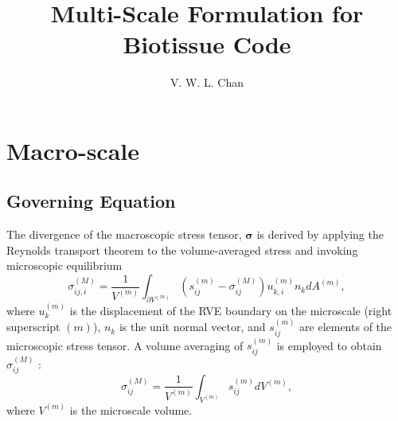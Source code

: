 \documentclass[12pt,aps,pre]{revtex4}
\begin{document}
\title{Multi-Scale Formulation for Biotissue Code}
\author{V. W. L. Chan}
\maketitle

\section{Macro-scale}

\subsection{Governing Equation}

The divergence of the macroscopic stress tensor, $\pmb{\sigma}$ is derived by applying the Reynolds transport theorem to the volume-averaged stress and invoking microscopic equilibrium \cite{Chandran:2007hy,Stylianopoulos:2007dp} 
%
\begin{equation}
\sigma_{ij,i}^{(M)} = \frac{1}{V^{(m)}} \int_{\partial V^{(m)}} \left( s_{ij}^{(m)} - \sigma_{ij}^{(M)} \right)u_{k,i}^{(m)} n_k dA^{(m)},
\label{eq:macro_stress_divergence}
\end{equation}
%
where $u_k^{(m)}$ is the displacement of the RVE boundary on the microscale (right superscript $(m)$), $n_k$ is the unit normal vector, and $s_{ij}^{(m)}$ are elements of the microscopic stress tensor. A volume averaging of $s_{ij}^{(m)}$ is employed to obtain $\sigma_{ij}^{(M)}$ \cite{Chandran:2007hy}:
%
\begin{equation}
\sigma_{ij}^{(M)} = \frac{1}{V^{(m)}}\int_{V^{(m)}}s_{ij}^{(m)} dV^{(m)},
\label{eq:macro_stress_volume_avg}
\end{equation}
%
where $V^{(m)}$ is the microscale volume.
\end{document}
